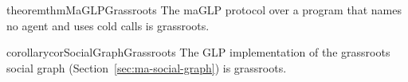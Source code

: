 \begin{restatable}{theorem}{thmMaGLPGrassroots}
\label{theorem:maGLP-grassroots}
The maGLP protocol over a program that names no agent and uses cold calls is grassroots.
\end{restatable}

\begin{restatable}{corollary}{corSocialGraphGrassroots}
\label{corollary:social-graph-grassroots}
The GLP implementation of the grassroots social graph (Section~\ref{sec:ma-social-graph}) is grassroots.
\end{restatable}
